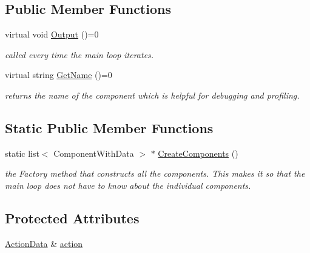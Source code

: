 \subsection*{\-Public \-Member \-Functions}
\begin{DoxyCompactItemize}
\item 
\hypertarget{class_component_a7d4181cf107d1aee4128dc1c3670d120}{
virtual void \hyperlink{class_component_a7d4181cf107d1aee4128dc1c3670d120}{\-Output} ()=0}
\label{class_component_a7d4181cf107d1aee4128dc1c3670d120}

\begin{DoxyCompactList}\small\item\em called every time the main loop iterates. \end{DoxyCompactList}\item 
\hypertarget{class_component_a66794e7955105c819bb50c0cf0073192}{
virtual string \hyperlink{class_component_a66794e7955105c819bb50c0cf0073192}{\-Get\-Name} ()=0}
\label{class_component_a66794e7955105c819bb50c0cf0073192}

\begin{DoxyCompactList}\small\item\em returns the name of the component which is helpful for debugging and profiling. \end{DoxyCompactList}\end{DoxyCompactItemize}
\subsection*{\-Static \-Public \-Member \-Functions}
\begin{DoxyCompactItemize}
\item 
static list$<$ \-Component\-With\-Data $>$ $\ast$ \hyperlink{class_component_a5fee0e84519c7bf66e0a4a746188d1a3}{\-Create\-Components} ()
\begin{DoxyCompactList}\small\item\em the \-Factory method that constructs all the components. \-This makes it so that the main loop does not have to know about the individual components. \end{DoxyCompactList}\end{DoxyCompactItemize}
\subsection*{\-Protected \-Attributes}
\begin{DoxyCompactItemize}
\item 
\hyperlink{class_action_data}{\-Action\-Data} \& \hyperlink{class_component_a479e7e36748bf2c7c37abeea1fac9493}{action}
\end{DoxyCompactItemize}



